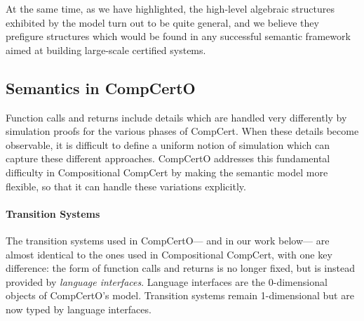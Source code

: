 \documentclass[acmsmall,screen,review,anonymous]{acmart}
\begin{document}
At the same time,
as we have highlighted,
the high-level algebraic structures
exhibited by the model
turn out to be quite general,
and we believe they prefigure structures which
would be found in any successful semantic framework
aimed at building large-scale certified systems.



\subsection{Semantics in CompCertO} \label{sec:survey:compcerto} %

Function calls and returns include details
which are handled very differently by simulation proofs
for the various phases of CompCert.
When these details become observable,
it is difficult to define a uniform notion of simulation
which can capture these different approaches.
%
CompCertO \citep{compcerto} addresses
this fundamental difficulty in Compositional CompCert
by making the semantic model more flexible,
so that it can handle these variations explicitly.

\paragraph{Transition Systems} %

The transition systems used in CompCertO---%
and in our work below---%
are almost identical to the ones used in Compositional CompCert,
with one key difference:
the form of function calls and returns is no longer fixed,
but is instead provided by \emph{language interfaces}.
Language interfaces are the 0-dimensional objects of CompCertO's model.
Transition systems remain 1-dimensional but are now typed
by language interfaces.
\end{document}
